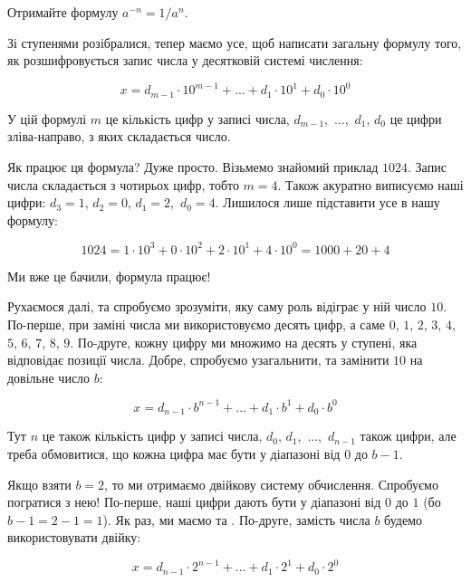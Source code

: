 \begin{exercise}
Отримайте формулу $a^{-n}=1/a^n$.
\end{exercise}

Зі ступенями розібралися, тепер маємо усе, щоб написати загальну формулу того, як розшифровується запис числа у десятковій системі числення:

\begin{equation}
x = d_{m-1} \cdot 10^{m-1} + ... + d_1 \cdot 10^1 + d_0 \cdot 10^0
\label{FormulaTenNum}
\end{equation}

У цій формулі $m$ це кількість цифр у записі числа, $d_{m-1}$,~...,~$d_1$, $d_0$ це цифри зліва-направо, з яких складається число.

Як працює ця формула? Дуже просто. Візьмемо знайомий приклад $1024$.
Запис числа складається з чотирьох цифр, тобто $m=4$.
Також акуратно виписуємо наші цифри: $d_3=1$, $d_2=0$, $d_1=2$,~$d_0=4$.
Лишилося лише підставити усе в нашу формулу:

$$ 1024 = 1 \cdot 10^3 + 0 \cdot 10^2 + 2 \cdot 10^1 + 4 \cdot 10 ^ 0 = 1000 + 20 + 4 $$

Ми вже це бачили, формула працює!

Рухаємося далі, та спробуємо зрозуміти, яку саму роль відіграє у ній число $10$.
По-перше, при заміні числа ми використовуємо десять цифр, а саме $0$, $1$, $2$, $3$, $4$, $5$, $6$, $7$, $8$, $9$.
По-друге, кожну цифру ми множимо на десять у ступені, яка відповідає позиції числа.
Добре, спробуємо узагальнити, та замінити $10$ на довільне число $b$:

\begin{equation}
x = d_{n-1} \cdot b^{n-1} + ... + d_1 \cdot b^1 + d_0 \cdot b^0
\label{FormulaBNum}
\end{equation}

Тут $n$ це також кількість цифр у записі числа, $d_0$, $d_1$,~...,~$d_{n-1}$ також цифри, але треба обмовитися, що кожна цифра має бути у діапазоні від $0$ до $b-1$.

Якщо взяти $b=2$, то ми отримаємо двійкову систему обчислення.
Спробуємо погратися з нею!
По-перше, наші цифри дають бути у діапазоні від $0$ до $1$ (бо $b-1=2-1=1$).
Як раз, ми маємо  та .
По-друге, замість числа $b$ будемо використовувати двійку:

\begin{equation}
x = d_{n-1} \cdot 2^{n-1} + ... + d_1 \cdot 2^1 + d_0 \cdot 2^0
\label{FormulaTwoNum}
\end{equation}


